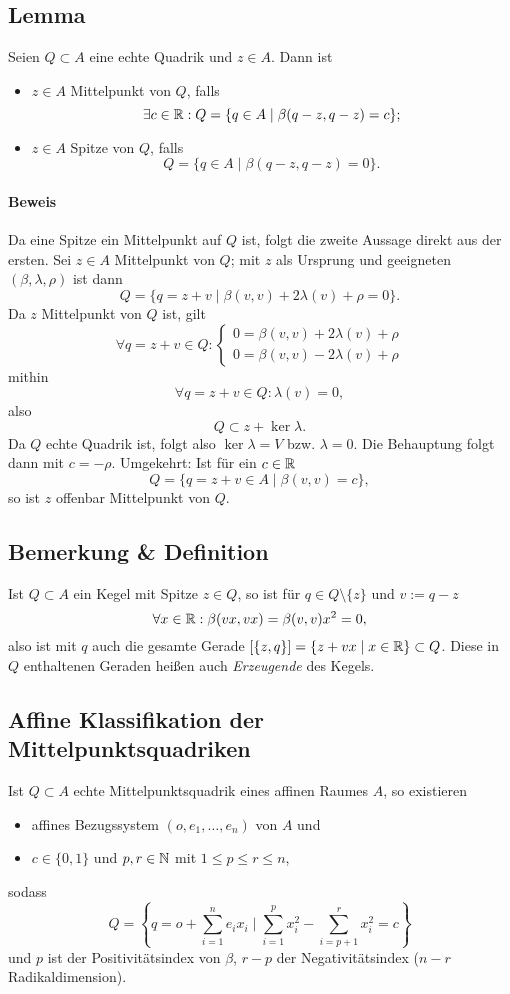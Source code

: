 \subsection{Lemma}
\begin{Lemma}[]
	Seien $ Q\subset A $ eine echte Quadrik und $ z\in A $. Dann ist
	\begin{itemize}
		\item $ z\in A $ Mittelpunkt von $ Q $, falls
			\[ \exists c\in \mathbb{R}: Q=\{q\in A\mid \beta(q-z,q-z)=c \}; \]
		\item $ z\in A $ Spitze von $ Q $, falls
			\[ Q=\{q\in A\mid \beta(q-z,q-z) = 0\}. \]
	\end{itemize}
\end{Lemma}
\paragraph{Beweis}
	Da eine Spitze ein Mittelpunkt auf $ Q $ ist, folgt die zweite Aussage direkt aus der ersten.
	Sei $ z\in A $ Mittelpunkt von $ Q $; mit $ z $ als Ursprung und geeigneten $ (\beta,\lambda,\rho) $ ist dann
		\[ Q=\{q=z+v\mid \beta(v,v)+2\lambda(v)+\rho = 0\}. \]
	Da $ z $ Mittelpunkt von $ Q $ ist, gilt
		\[ \forall q=z+v\in Q: \begin{cases}
		0 = \beta(v,v)+2\lambda(v)+\rho\\
		0 = \beta(v,v)-2\lambda(v)+\rho
		\end{cases} \]
	mithin
		\[ \forall q=z+v\in Q: \lambda(v) = 0, \]
	also 
		\[ Q\subset z +\ker \lambda. \]
	Da $ Q $ echte Quadrik ist, folgt also $ \ker \lambda = V $ bzw. $ \lambda = 0 $. Die Behauptung folgt dann mit $ c=-\rho $. Umgekehrt: Ist für ein $ c\in \mathbb{R} $
		\[ Q=\{q=z+v\in A\mid \beta(v,v)=c \}, \]
	so ist $ z $ offenbar Mittelpunkt von $ Q $.
\subsection{Bemerkung \& Definition}
	Ist $ Q\subset A $ ein Kegel mit Spitze $ z\in Q $, so ist für $ q\in Q\setminus\{z\} $ und $ v:= q-z $
		\[ \forall x\in \mathbb{R}: \beta(vx,vx)= \beta(v,v)x^2 = 0,  \]
	also ist mit $ q $ auch die gesamte Gerade $ [\{z,q\}] = \{z+vx\mid x\in \mathbb{R}\}\subset Q $. Diese in $ Q $ enthaltenen Geraden heißen auch \emph{Erzeugende} des Kegels.
\subsection{Affine Klassifikation der Mittelpunktsquadriken}
\begin{Lemma}[]
	Ist $ Q\subset A $ echte Mittelpunktsquadrik eines affinen Raumes $ A $, so existieren
	\begin{itemize}
		\item affines Bezugssystem $ (o,e_1,\dots,e_n) $ von $ A $ und
		\item $ c\in \{0,1\} $ und $ p,r\in \mathbb{N} $ mit $ 1\leq p\leq r \leq n $, 
	\end{itemize}
	sodass 
		\[ Q=\left\{q=o+\sum_{i=1}^{n}e_ix_i\mid \sum_{i=1}^{p}x_i^2-\sum_{i=p+1}^{r}x_i^2 = c \right\} \]
	und $ p $ ist der Positivitätsindex von $ \beta $, $ r-p $ der Negativitätsindex ($ n-r $ Radikaldimension). 
\end{Lemma}

